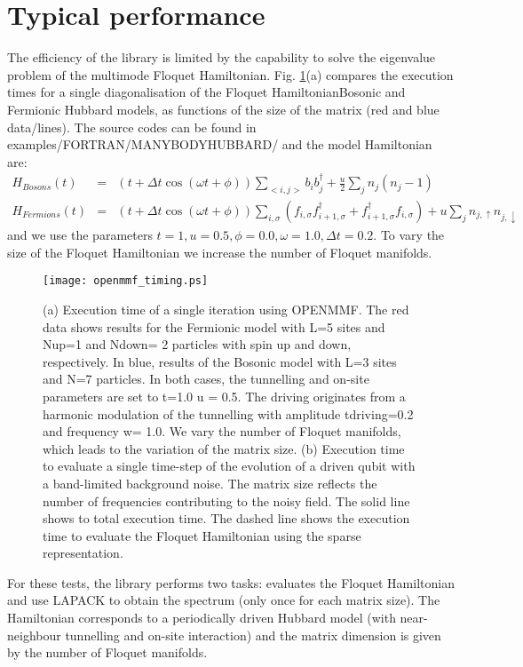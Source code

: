 \documentclass[10pt,a4paper]{article}
\begin{document}
\section{Typical performance}
The efficiency of the library is limited by the capability to solve the eigenvalue problem of the multimode Floquet Hamiltonian. Fig. \ref{fig:performance}(a) compares the execution times for a single diagonalisation of the Floquet HamiltonianBosonic and Fermionic Hubbard models, as functions of the size of the matrix (red and blue data/lines). The source codes can be found in   examples/FORTRAN/MANYBODYHUBBARD/  and the model Hamiltonian are:
\begin{eqnarray}
H_{Bosons}(t)   &=&  (t+ \Delta t \cos(\omega t + \phi))\sum_{<i,j>}   b_i b_j^\dagger  + \frac{u}{2}\sum_j  n_j(n_j-1) \nonumber \\
H_{Fermions}(t) &=&   (t+ \Delta t \cos(\omega t + \phi)) \sum_{i,\sigma} (f_{i,\sigma} f_{i+1,\sigma}^\dagger +  f_{i+1,\sigma}^\dagger f_{i,\sigma})  + u \sum_j n_{j,\uparrow} n_{j,\downarrow} \nonumber 
\end{eqnarray}
and we use the parameters $t=1, u=0.5, \phi = 0.0, \omega = 1.0, \Delta t = 0.2$. To vary the size of the Floquet Hamiltonian we increase the number of Floquet manifolds. 

\begin{figure}
\centering
\texttt{[image: openmmf\_timing.ps]}
\caption{\label{fig:performance} (a) Execution time of a single iteration using OPENMMF. The red data shows results for the Fermionic model with L=5 sites and Nup=1 and Ndown= 2 particles with spin up and down, respectively. In blue, results of the Bosonic model with L=3 sites and N=7 particles. In both cases, the tunnelling and on-site parameters are set to t=1.0 u = 0.5. The driving originates from a harmonic modulation of the tunnelling with amplitude tdriving=0.2 and frequency w= 1.0. We vary the number of Floquet manifolds, which leads to the variation of the matrix size. (b) Execution time to evaluate a single time-step of the evolution of a driven qubit with a band-limited background noise.  The matrix size reflects the number of frequencies contributing to the noisy field. The solid line shows to total execution time. The dashed line shows the execution time to evaluate the Floquet Hamiltonian using the sparse representation. }
\end{figure}

For these tests, the library performs two tasks: evaluates the Floquet Hamiltonian and use LAPACK to obtain the spectrum (only once for each matrix size). The Hamiltonian corresponds to a periodically driven Hubbard model (with near-neighbour tunnelling and on-site interaction) and the matrix dimension is given by the number of Floquet manifolds.
\end{document}

